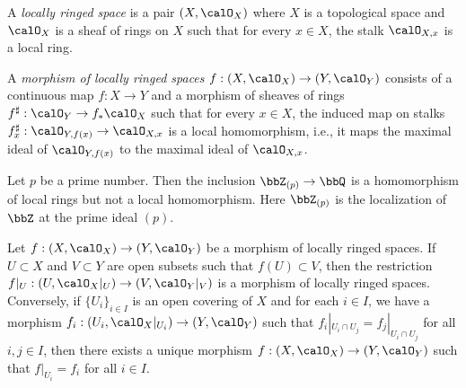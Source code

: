     \begin{definition}\label{def:locally_ringed_space}
        A \emph{locally ringed space} is a pair \((X, \calO_X)\) where \(X\) is a topological space and \(\calO_X\) is a sheaf of rings on \(X\) such that for every \(x \in X\), the stalk \(\calO_{X,x}\) is a local ring.
        
        A \emph{morphism of locally ringed spaces} \(f : (X, \calO_X) \to (Y, \calO_Y)\) consists of a continuous map \(f : X \to Y\) and a morphism of sheaves of rings \(f^\sharp : \calO_Y \to f_*\calO_X\) 
        such that for every \(x \in X\), the induced map on stalks \(f_x^\sharp : \calO_{Y,f(x)} \to \calO_{X,x}\) is a local homomorphism, 
        i.e., it maps the maximal ideal of \(\calO_{Y,f(x)}\) to the maximal ideal of \(\calO_{X,x}\).
    \end{definition}

    \begin{example}\label{eg:non_local_homomorphism_of_local_rings}
        Let \(p\) be a prime number.
        Then the inclusion \(\bbZ_{(p)} \to \bbQ\) is a homomorphism of local rings but not a local homomorphism.
        Here \(\bbZ_{(p)}\) is the localization of \(\bbZ\) at the prime ideal \((p)\).
    \end{example}

    \begin{example}\label{eg:glue_morphisms_of_locally_ringed_spaces}
        Let \(f : (X, \calO_X) \to (Y, \calO_Y)\) be a morphism of locally ringed spaces.
        If \(U \subset X\) and \(V \subset Y\) are open subsets such that \(f(U) \subset V\), then the restriction \(f|_U : (U, \calO_X|_U) \to (V, \calO_Y|_V)\) is a morphism of locally ringed spaces.
        Conversely, if \(\{U_i\}_{i \in I}\) is an open covering of \(X\) and for each \(i \in I\), we have a morphism \(f_i : (U_i, \calO_X|_{U_i}) \to (Y, \calO_Y)\) such that \(f_i|_{U_i \cap U_j} = f_j|_{U_i \cap U_j}\) for all \(i,j \in I\),
        then there exists a unique morphism \(f : (X, \calO_X) \to (Y, \calO_Y)\) such that \(f|_{U_i} = f_i\) for all \(i \in I\).
    \end{example}


